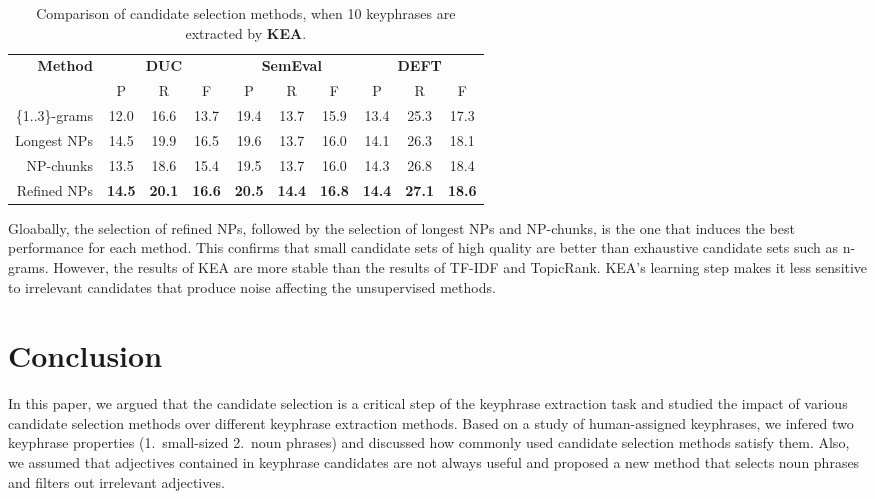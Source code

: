       \begin{table}
        \centering
        \begin{tabular}{rccccccccc}
          \toprule
          \multirow{2}{*}[-2pt]{\textbf{Method}} & \multicolumn{3}{c}{\textbf{DUC}} & \multicolumn{3}{c}{\textbf{SemEval}} & \multicolumn{3}{c}{\textbf{DEFT}}\\
          \cmidrule(r){2-4}\cmidrule(lr){5-7}\cmidrule(l){8-10}
          & P & R & F & P & R & F & P & R & F\\
          \midrule
          \{1..3\}-grams & 12.0 & 16.6 & 13.7 & 19.4 & 13.7 & 15.9 & 13.4 & 25.3 & 17.3\\
          Longest NPs & 14.5 & 19.9 & 16.5 & 19.6 & 13.7 & 16.0 & 14.1 & 26.3 & 18.1\\
          NP-chunks & 13.5 & 18.6 & 15.4 & 19.5 & 13.7 & 16.0 & 14.3 & 26.8 & 18.4\\
          Refined NPs & \textbf{14.5} & \textbf{20.1} & \textbf{16.6} & \textbf{20.5} & \textbf{14.4} & \textbf{16.8} & \textbf{14.4} & \textbf{27.1} & \textbf{18.6}\\
          \bottomrule
        \end{tabular}
        \caption{Comparison of candidate selection methods, when 10 keyphrases
                 are extracted by \textbf{KEA}.
                 \label{tab:kea_results}}
      \end{table}
      
      Gloabally, the selection of refined NPs, followed by the selection of
      longest NPs and NP-chunks, is the one that induces the best performance
      for each method. This confirms that small candidate sets of high quality
      are better than exhaustive candidate sets such as n-grams. However, the
      results of KEA are more stable than the results of TF-IDF and TopicRank.
      KEA's learning step makes it less sensitive to irrelevant candidates that
      produce noise affecting the unsupervised methods. 

\section{Conclusion}
\label{sec:conclusion}
  In this paper, we argued that the candidate selection is a critical step of
  the keyphrase extraction task and studied the impact of various candidate
  selection methods over different keyphrase extraction methods. Based on a
  study of human-assigned keyphrases, we infered two keyphrase properties
  (1.~small-sized 2.~noun phrases) and discussed how commonly used candidate
  selection methods satisfy them. Also, we assumed that adjectives contained in
  keyphrase candidates are not always useful and proposed a new method that
  selects noun phrases and filters out irrelevant adjectives.


